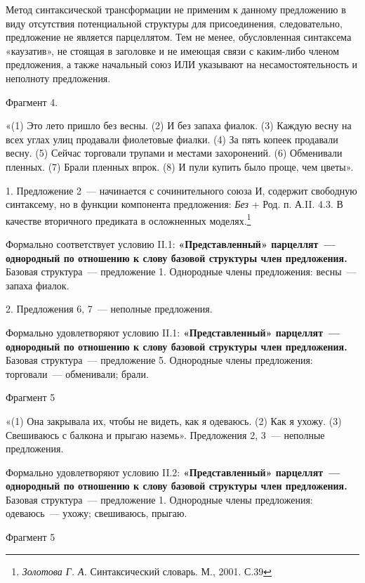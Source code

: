 \documentclass{kursa4}
\begin{document}
      {Метод синтаксической трансформации не применим к данному предложению в виду отсутствия потенциальной структуры для присоединения, следовательно, предложение не является парцеллятом. Тем не менее, обусловленная синтаксема «каузатив», не стоящая в заголовке и не имеющая связи с каким-либо членом предложения, а также начальный союз ИЛИ указывают на несамостоятельность и неполноту предложения. }

      {Фрагмент 4.}

      {«(1) Это лето пришло без весны. (2) И без запаха фиалок. (3) Каждую весну на всех углах улиц продавали фиолетовые фиалки. (4) За пять копеек продавали весну. (5) Сейчас торговали трупами и местами захоронений. (6) Обменивали
      }{пленных. (7) Брали пленных впрок. (8) И пули купить было проще, чем цветы».}

      {1. Предложение 2~--- начинается с сочинительного союза И, содержит свободную синтаксему, но в функции компонента предложения: }\textit{{Без }}{+ Род. п.}{ А.II. 4.3. В качестве вторичного предиката в осложненных моделях.}\footnote{{ }\textit{{Золотова Г. А.
      }}{Синтаксический словарь. М., 2001. С.39}}

      {Формально соответствует }{условию
      II.1}{:
      }\textbf{{«Представленный» парцеллят~--- однородный по отношению к слову базовой структуры член предложения.
      }}{Базовая структура~--- предложение 1. Однородные члены предложения: весны~--- запаха фиалок.}

      {2. Предложения 6, 7~--- неполные предложения.}

      {Формально
      }{удовлетворяют}{
      }{условию II.1}{:
      }\textbf{{«Представленный» парцеллят~--- однородный по отношению к слову базовой структуры член предложения.
      }}{Базовая структура~--- предложение 5. Однородные члены предложения: торговали~--- обменивали; брали.}

      {Фрагмент 5}

      «(1) Она закрывала их, чтобы не видеть, как я одеваюсь. (2) Как я ухожу. (3) Свешиваюсь с балкона и прыгаю наземь». Предложения 2, 3~--- неполные предложения. 

      {Формально
      }{удовлетворяют}{
      }{условию }{II.2}{:
      }\textbf{{«Представленный» парцеллят~--- однородный по отношению к слову базовой структуры член предложения.
      }}{Базовая структура~--- предложение
      }{1}{. Однородные члены предложения: }{одеваюсь~--- ухожу; свешиваюсь, прыгаю.}

      {Фрагмент 5}
\end{document}
